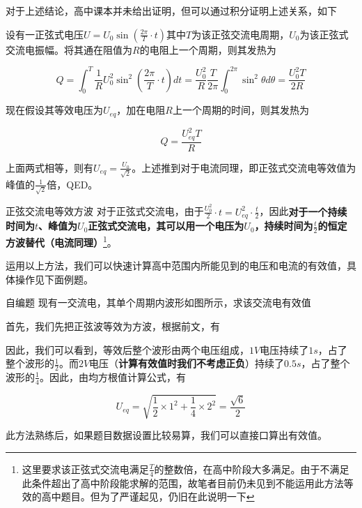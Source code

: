 对于上述结论，高中课本并未给出证明，但可以通过积分证明上述关系，如下

设有一正弦式电压$U = U_0 \sin (\frac{2 \pi}{T} \cdot t )$其中$T$为该正弦交流电周期，$U_0$为该正弦式交流电振幅。将其通在阻值为$R$的电阻上一个周期，则其发热为

$$Q = \int_0^T \frac{1}{R} U_0^2 \sin^2 (\frac{2 \pi}{T} \cdot t ) dt = \frac{U_0^2}{R} \frac{T}{2 \pi} \int_0^{2 \pi} \sin^2 \theta d \theta = \frac{U_0^2 T}{2R}$$

现在假设其等效电压为$U_{eq}$，加在电阻$R$上一个周期的时间，则其发热为

$$ Q = \frac{U_{eq}^2 T}{R} $$

上面两式相等，则有$U_{eq} = \frac{U_0}{\sqrt{2}}$。上述推到对于电流同理，即正弦式交流电等效值为峰值的$\frac{1}{\sqrt{2}}$倍，QED。

\begin{theo}[label=zxbdxfb]{正弦交流电等效方波}{}
对于正弦式交流电，由于$\frac{U_0^2}{2} \cdot t = U_{eq}^2 \cdot \frac{t}{2}$，因此\textbf{对于一个持续时间为$t$、峰值为$U_0$正弦式交流电，其可以用一个电压为$U_0$，持续时间为$\frac{t}{2}$的恒定方波替代（电流同理）}\footnote{这里要求该正弦式交流电满足$\frac{T}{4}$的整数倍，在高中阶段大多满足。由于不满足此条件超出了高中阶段能求解的范围，故笔者目前仍未见到不能运用此方法等效的高中题目。但为了严谨起见，仍旧在此说明一下}。
\end{theo}



运用以上方法，我们可以快速计算高中范围内所能见到的电压和电流的有效值，具体操作见下面例题。

\begin{ep}{自编题}{}
现有一交流电，其单个周期内波形如图所示，求该交流电有效值



首先，我们先把正弦波等效为方波，根据前文，有



因此，我们可以看到，等效后整个波形由两个电压组成，$1V$电压持续了$1s$，占了整个波形的$\frac{1}{2}$。而$2V$电压（\textbf{计算有效值时我们不考虑正负}）持续了$0.5s$，占了整个波形的$\frac{1}{4}$。因此，由均方根值计算公式，有

$$U_{eq} = \sqrt{\frac{1}{2} \times 1^2 + \frac{1}{4} \times 2^2} = \frac{\sqrt{6}}{2}$$

此方法熟练后，如果题目数据设置比较易算，我们可以直接口算出有效值。

\end{ep}

